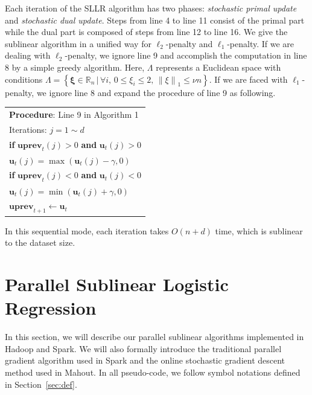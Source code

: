 \documentclass[10pt, conference, compsocconf]{IEEEtran}
\newcommand{\bu}{\mathbf{u}}
\newcommand{\buprev}{\mathbf{uprev}}
\newcommand{\bxi}{\mathbf{\xi}}
\newcommand{\lc}{\left(}
\newcommand{\rc}{\right)}
\newcommand{\lj}{\lc j\rc}
\newcommand{\tspace}{\hspace*{2em}}
\begin{document}
Each iteration of the SLLR algorithm has two phases: \textit{stochastic primal update} and \textit{stochastic dual update}.
Steps from line 4 to line 11 consist of the primal part while the dual part is composed of steps from line 12 to line 16.
We give the sublinear algorithm in a unified way for $\ell_2$-penalty and $\ell_1$-penalty.
If we are dealing with $\ell_2$-penalty, we ignore line 9 and accomplish the computation in line 8 by a simple greedy algorithm.
Here, $\Lambda$ represents a Euclidean space with conditions $
\Lambda=\left\{ \bxi\in\mathbb{R}_{n} \, | \, \forall i, \, 0\leq{\xi}_{i}\leq 2, \, {\|\xi \|}_{1}\leq \nu n  \right
\}$.
If we are faced with $\ell_1$-penalty, we ignore line 8 and expand the procedure of line 9 as following.
\begin{table} [ht]
\begin{tabular}{l}
\hline\noalign{\smallskip}
\textbf{Procedure}: Line 9 in Algorithm 1\\
\noalign{\smallskip}
\hline
\noalign{\smallskip}
Iterations: $j=1 \sim d$ \\
\tspace \textbf{if} $\buprev_t\lj>0$ \textbf{and} $\bu_t\lj>0$ \\
\tspace\tspace $\bu_t\lj=\max \lc \bu_t\lj-\gamma ,0 \rc$ \\
\tspace \textbf{if} $\buprev_t\lj<0$ \textbf{and} $\bu_t\lj<0$ \\
\tspace\tspace $\bu_t\lj=\min \lc \bu_t\lj+\gamma ,0 \rc$ \\
$\buprev_{t+1}\leftarrow\bu_t$ \\
\hline
\end{tabular}
\end{table}

In this sequential mode, each iteration takes $O(n+d)$ time, which is sublinear to the dataset size.

\section{Parallel Sublinear Logistic Regression} \label{sec:framework}
In this section, we will describe our parallel sublinear algorithms implemented in Hadoop and Spark.
We will also formally introduce the traditional parallel gradient algorithm used in Spark and the online stochastic gradient descent method used in Mahout.
In all pseudo-code, we follow symbol notations defined in Section~\ref{sec:def}.
\end{document}
